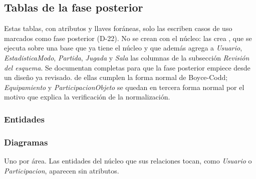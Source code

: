 \subsection*{Tablas de la fase posterior}

Estas \bdFpNumTablas{} tablas, con \bdFpNumColumnas{} atributos y \bdFpNumForaneas{} llaves foráneas, solo las escriben casos de uso marcados como fase posterior (\mbox{D-22}). No se crean con el núcleo: las crea , que se ejecuta sobre una base que ya tiene el núcleo y que además agrega a \textit{Usuario}, \textit{EstadisticaModo}, \textit{Partida}, \textit{Jugada} y \textit{Sala} las columnas de la subsección \textit{Revisión del esquema}. Se documentan completas para que la fase posterior empiece desde un diseño ya revisado. \bdFpNumFNBC{} de ellas cumplen la forma normal de Boyce-Codd; \textit{Equipamiento} y \textit{ParticipacionObjeto} se quedan en tercera forma normal por el motivo que explica la verificación de la normalización.

\subsubsection*{Entidades}


\subsubsection*{Diagramas}
Uno por área. Las entidades del núcleo que sus relaciones tocan, como \textit{Usuario} o \textit{Participacion}, aparecen sin atributos.

